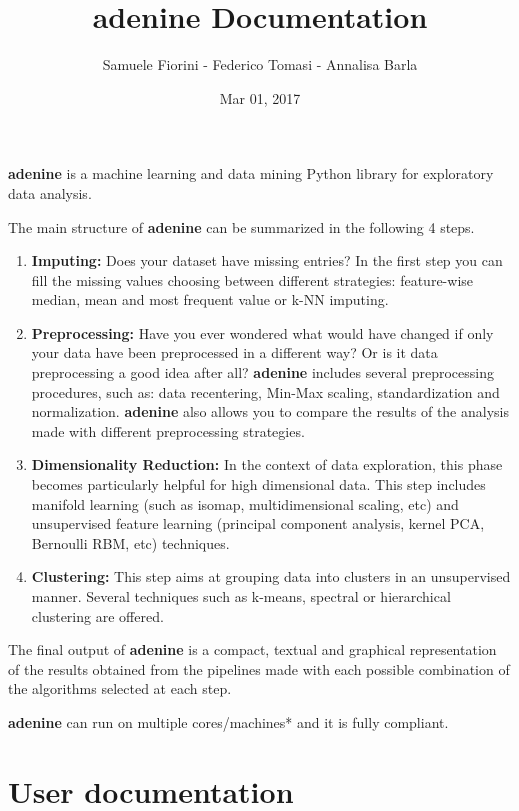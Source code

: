 \documentclass[letterpaper,10pt,english]{sphinxmanual}
\title{adenine Documentation}
\date{Mar 01, 2017}
\author{Samuele Fiorini - Federico Tomasi - Annalisa Barla}
\begin{document}
\maketitle
\tableofcontents
{}\label{index::doc}


\textbf{adenine} is a machine learning and data mining Python library for exploratory data analysis.

The main structure of \textbf{adenine} can be summarized in the following 4 steps.
\begin{enumerate}
\item {} 
\textbf{Imputing:} Does your dataset have missing entries? In the first step you can fill the missing values choosing between different strategies: feature-wise median, mean and most frequent value or k-NN imputing.

\item {} 
\textbf{Preprocessing:} Have you ever wondered what would have changed if only your data have been preprocessed in a different way? Or is it data preprocessing a good idea after all? \textbf{adenine} includes several preprocessing procedures, such as: data recentering, Min-Max scaling, standardization and normalization. \textbf{adenine} also allows you to compare the results of the analysis made with different preprocessing strategies.

\item {} 
\textbf{Dimensionality Reduction:} In the context of data exploration, this phase becomes particularly helpful for high dimensional data. This step includes manifold learning (such as isomap, multidimensional scaling, etc) and unsupervised feature learning (principal component analysis, kernel PCA, Bernoulli RBM, etc) techniques.

\item {} 
\textbf{Clustering:} This step aims at grouping data into clusters in an unsupervised manner. Several techniques such as k-means, spectral or hierarchical clustering are offered.

\end{enumerate}

The final output of \textbf{adenine} is a compact, textual and graphical representation of the results obtained from the pipelines made with each possible combination of the algorithms selected at each step.

\textbf{adenine} can run on multiple cores/machines* and it is fully  compliant.


\chapter{User documentation}
\label{index:adenine-a-data-exploration-pipeline}\label{index:user-documentation}
\end{document}
